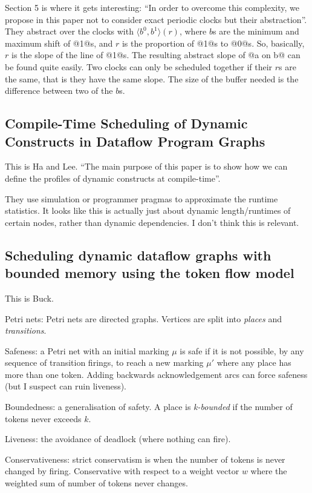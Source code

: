 Section 5 is where it gets interesting: ``In order to overcome this complexity, we propose in this paper not to consider exact periodic clocks but their abstraction''.
They abstract over the clocks with $\langle b^0, b^1 \rangle (r)$, where $b$s are the minimum and maximum shift of @1@s, and $r$ is the proportion of @1@s to @0@s.
So, basically, $r$ is the slope of the line of @1@s. The resulting abstract slope of @a on b@ can be found quite easily.
Two clocks can only be scheduled together if their $r$s are the same, that is they have the same slope.
The size of the buffer needed is the difference between two of the $b$s.

\subsection{Compile-Time Scheduling of Dynamic Constructs in Dataflow Program Graphs}
This is Ha and Lee\cite{ha1997compile}.
``The main purpose of this paper is to show how we can define the profiles of dynamic constructs at compile-time''.

They use simulation or programmer pragmas to approximate the runtime statistics.
It looks like this is actually just about dynamic length/runtimes of certain nodes, rather than dynamic dependencies.
I don't think this is relevant.


\subsection{Scheduling dynamic dataflow graphs with bounded memory using the token flow model}
This is Buck\cite{buck1993scheduling}.

Petri nets: Petri nets are directed graphs. Vertices are split into \emph{places} and \emph{transitions}.

Safeness: a Petri net with an initial marking $\mu$ is safe if it is not possible, by any sequence of transition firings, to reach a new marking $\mu'$ where any place has more than one token.
Adding backwards acknowledgement arcs can force safeness (but I suspect can ruin liveness).

Boundedness: a generalisation of safety. A place is \emph{k-bounded} if the number of tokens never exceeds $k$.

Liveness: the avoidance of deadlock (where nothing can fire).

Conservativeness: strict conservatism is when the number of tokens is never changed by firing. Conservative with respect to a weight vector $w$ where the weighted sum of number of tokens never changes.

